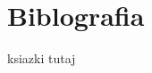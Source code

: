 \setcounter{secnumdepth}{-1}
\renewcommand{\chaptername}{}
\chapter{Biblografia} 
 
 
 ksiazki tutaj
